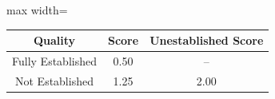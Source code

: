 \begin{adjustbox}{max width=\linewidth}
\begin{tabular}{ccc}
\toprule
\textbf{Quality} & \textbf{Score} & \textbf{Unestablished Score} \\
\midrule
Fully Established & 0.50 & -- \\
Not Established & 1.25 & 2.00 \\
\bottomrule
\end{tabular}
\end{adjustbox}
